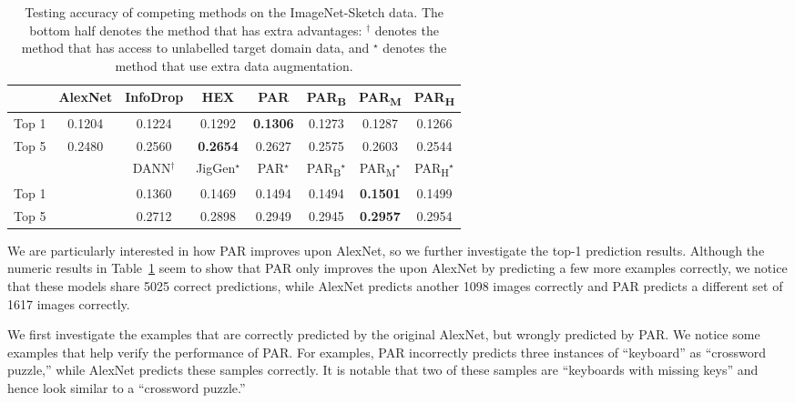 \documentclass{article}
\begin{document}
\begin{table}[]
\caption{Testing accuracy of competing methods on the ImageNet-Sketch data. 
The bottom half denotes the method that has extra advantages: 
$^\dagger$ denotes the method that has access to unlabelled target domain data, 
and $^\star$ denotes the method that use extra data augmentation. 
\break \tiny}
\label{tab:sketch}
\centering
\begin{tabular}{cccccccc}
\hline
 & AlexNet & InfoDrop & HEX & PAR & PAR\textsubscript{B} & PAR\textsubscript{M} & PAR\textsubscript{H} \\ \hline
Top 1 & 0.1204 & 0.1224 & 0.1292 & \textbf{0.1306} & 0.1273 & 0.1287 & 0.1266 \\
Top 5 & 0.2480 & 0.2560 & \textbf{0.2654} & 0.2627 & 0.2575 & 0.2603 & 0.2544 \\ \hline
 &  & DANN$^{\dagger}$ & JigGen$^\star$ & PAR$^\star$ & PAR\textsubscript{B}$^\star$ & PAR\textsubscript{M}$^\star$ & PAR\textsubscript{H}$^\star$ \\ \hline
Top 1 &  & 0.1360 & 0.1469 & 0.1494 & 0.1494 & \textbf{0.1501} & 0.1499 \\
Top 5 &  & 0.2712 & 0.2898 & 0.2949 & 0.2945 & \textbf{0.2957} & 0.2954 \\ \hline
\end{tabular}
\end{table}

We are particularly interested in how PAR improves upon AlexNet, so we further investigate the top-1 prediction results. 
Although the numeric results in Table~\ref{tab:sketch} seem to show that PAR only improves the upon AlexNet by predicting a few more examples correctly, we notice that these models share 5025 correct predictions, while AlexNet predicts another 1098 images correctly and PAR predicts a different set of 1617 images correctly. 



We first investigate the examples that are correctly predicted by the original AlexNet, but wrongly predicted by PAR. 
We notice some examples that help verify the performance of PAR. 
For examples, PAR incorrectly predicts three instances of ``keyboard'' as ``crossword puzzle,'' while AlexNet predicts these samples correctly.  
It is notable that two of these samples are ``keyboards with missing keys'' and hence look similar to a ``crossword puzzle.'' 
\end{document}
